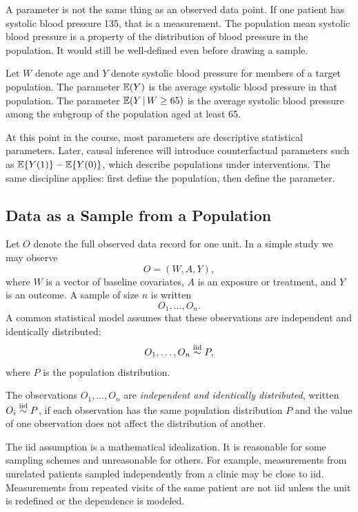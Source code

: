 A parameter is not the same thing as an observed data point. If one patient has systolic blood pressure 135, that is a measurement. The population mean systolic blood pressure is a property of the distribution of blood pressure in the population. It would still be well-defined even before drawing a sample.

\begin{example}
Let $W$ denote age and $Y$ denote systolic blood pressure for members of a target population. The parameter $\mathbb{E}(Y)$ is the average systolic blood pressure in that population. The parameter $\mathbb{E}(Y\,\vert\, W\ge 65)$ is the average systolic blood pressure among the subgroup of the population aged at least 65.
\end{example}

At this point in the course, most parameters are descriptive statistical parameters. Later, causal inference will introduce counterfactual parameters such as $\mathbb{E}\{Y(1)\}-\mathbb{E}\{Y(0)\}$, which describe populations under interventions. The same discipline applies: first define the population, then define the parameter.

\subsection{Data as a Sample from a Population}

Let $O$ denote the full observed data record for one unit. In a simple study we may observe
\[
O=(W,A,Y),
\]
where $W$ is a vector of baseline covariates, $A$ is an exposure or treatment, and $Y$ is an outcome. A sample of size $n$ is written
\[
O_1,\ldots,O_n.
\]
A common statistical model assumes that these observations are independent and identically distributed:
\[
O_1,\ldots,O_n \overset{\mathrm{iid}}{\sim} P,
\]
where $P$ is the population distribution.

\begin{definition}
The observations $O_1,\ldots,O_n$ are \emph{independent and identically distributed}, written $O_i \overset{\mathrm{iid}}{\sim} P$, if each observation has the same population distribution $P$ and the value of one observation does not affect the distribution of another.
\end{definition}

The iid assumption is a mathematical idealization. It is reasonable for some sampling schemes and unreasonable for others. For example, measurements from unrelated patients sampled independently from a clinic may be close to iid. Measurements from repeated visits of the same patient are not iid unless the unit is redefined or the dependence is modeled.

